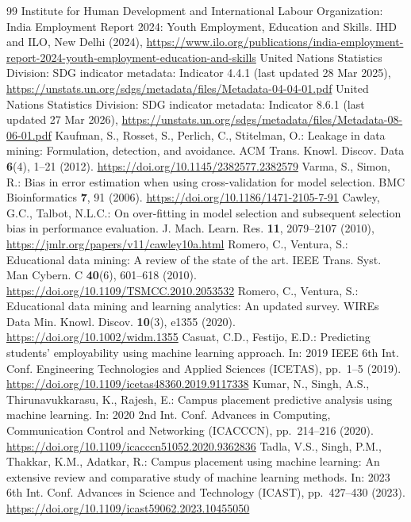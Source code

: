 \documentclass[runningheads]{llncs}
\providecommand{\doi}[1]{\url{https://doi.org/#1}}
\begin{document}
\begin{thebibliography}{99}
 Institute for Human Development and International Labour Organization: India Employment Report 2024: Youth Employment, Education and Skills. IHD and ILO, New Delhi (2024), \url{https://www.ilo.org/publications/india-employment-report-2024-youth-employment-education-and-skills}
 United Nations Statistics Division: SDG indicator metadata: Indicator 4.4.1 (last updated 28 Mar 2025), \url{https://unstats.un.org/sdgs/metadata/files/Metadata-04-04-01.pdf}
 United Nations Statistics Division: SDG indicator metadata: Indicator 8.6.1 (last updated 27 Mar 2026), \url{https://unstats.un.org/sdgs/metadata/files/Metadata-08-06-01.pdf}
 Kaufman, S., Rosset, S., Perlich, C., Stitelman, O.: Leakage in data mining: Formulation, detection, and avoidance. ACM Trans. Knowl. Discov. Data \textbf{6}(4), 1--21 (2012). \doi{10.1145/2382577.2382579}
 Varma, S., Simon, R.: Bias in error estimation when using cross-validation for model selection. BMC Bioinformatics \textbf{7}, 91 (2006). \doi{10.1186/1471-2105-7-91}
 Cawley, G.C., Talbot, N.L.C.: On over-fitting in model selection and subsequent selection bias in performance evaluation. J. Mach. Learn. Res. \textbf{11}, 2079--2107 (2010), \url{https://jmlr.org/papers/v11/cawley10a.html}
 Romero, C., Ventura, S.: Educational data mining: A review of the state of the art. IEEE Trans. Syst. Man Cybern. C \textbf{40}(6), 601--618 (2010). \doi{10.1109/TSMCC.2010.2053532}
 Romero, C., Ventura, S.: Educational data mining and learning analytics: An updated survey. WIREs Data Min. Knowl. Discov. \textbf{10}(3), e1355 (2020). \doi{10.1002/widm.1355}
 Casuat, C.D., Festijo, E.D.: Predicting students' employability using machine learning approach. In: 2019 IEEE 6th Int. Conf. Engineering Technologies and Applied Sciences (ICETAS), pp.~1--5 (2019). \doi{10.1109/icetas48360.2019.9117338}
 Kumar, N., Singh, A.S., Thirunavukkarasu, K., Rajesh, E.: Campus placement predictive analysis using machine learning. In: 2020 2nd Int. Conf. Advances in Computing, Communication Control and Networking (ICACCCN), pp.~214--216 (2020). \doi{10.1109/icacccn51052.2020.9362836}
 Tadla, V.S., Singh, P.M., Thakkar, K.M., Adatkar, R.: Campus placement using machine learning: An extensive review and comparative study of machine learning methods. In: 2023 6th Int. Conf. Advances in Science and Technology (ICAST), pp.~427--430 (2023). \doi{10.1109/icast59062.2023.10455050}

\end{thebibliography}
\end{document}

